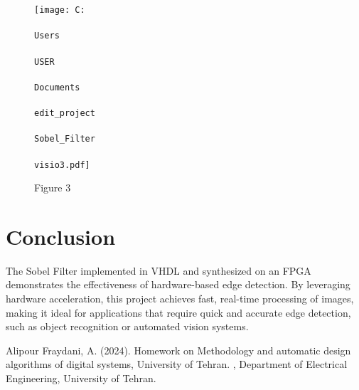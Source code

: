 \documentclass[DIV=calc, paper=a4, fontsize=11pt, twocolumn]{scrartcl}	 %
\begin{document}
\begin{figure}[htbp]
  \centering
  \texttt{[image: C:\\\\Users\\\\USER\\\\Documents\\\\edit\_project\\\\Sobel\_Filter\\\\visio3.pdf]}
  \caption{Figure 3}
  \label{fig:visio-diagram}
\end{figure}





\section*{\small{Conclusion}}


The Sobel Filter implemented in VHDL and synthesized on an FPGA demonstrates the effectiveness of 
hardware-based edge detection. By leveraging hardware acceleration, this project achieves fast, 
real-time processing of images, making it ideal for applications that require quick and accurate edge 
detection, such as object recognition or automated vision systems.


\begin{thebibliography}{99} %

  Alipour Fraydani, A. (2024).
  \newblock Homework on Methodology and automatic design algorithms of digital systems, University of Tehran.
  , Department of Electrical Engineering, University of Tehran.
  
\end{thebibliography}

\end{document}
